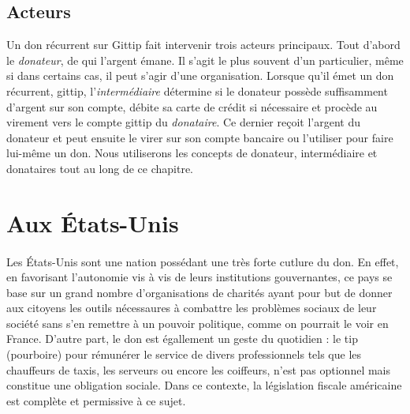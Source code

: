        \subsection{Acteurs}
            Un don récurrent sur Gittip fait intervenir trois acteurs
            principaux.
            Tout d'abord le \emph{donateur}, de qui l'argent émane.
            Il s'agit le plus souvent d'un particulier, même si dans
            certains cas, il peut s'agir d'une organisation.
            Lorsque qu'il émet un don récurrent, gittip,
            l'\emph{intermédiaire} détermine si
            le donateur possède suffisamment d'argent sur son compte,
            débite sa carte de crédit si nécessaire et procède au
            virement vers le compte gittip du \emph{donataire}. Ce dernier
            reçoit l'argent du donateur et peut ensuite le virer sur son
            compte bancaire ou l'utiliser pour faire lui-même un don.
            Nous utiliserons les concepts de donateur, intermédiaire et
            donataires tout au long de ce chapitre.
    \section{Aux États-Unis}
        \paragraph{}
            Les États-Unis sont une nation possédant une très forte cutlure
            du don. En effet, en favorisant l'autonomie vis à vis de leurs
            institutions gouvernantes, ce pays se base sur un grand nombre
            d'organisations de charités ayant pour but de donner aux citoyens
            les outils nécessaures à combattre les problèmes sociaux de leur
            société sans s'en remettre à un pouvoir politique, comme on
            pourrait le voir en France.
            D'autre part, le don est égallement un geste du quotidien :
            le tip (pourboire) pour rémunérer le service de divers
            professionnels tels que les chauffeurs de taxis, les serveurs ou
            encore les coiffeurs, n'est pas optionnel mais constitue une
            obligation sociale.
            Dans ce contexte, la législation fiscale américaine est
            complète et permissive à ce sujet.
